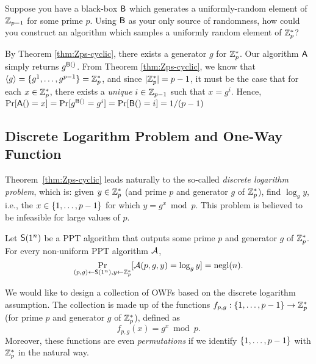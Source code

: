 \documentclass[11pt]{article}
\begin{document}
\begin{question}
    Suppose you have a black-box \(\mathsf{B}\) which generates a uniformly-random element
    of \(\mathbb{Z}_{p-1}\) for some prime \(p\). Using \(\mathsf{B}\) as your only source of
    randomness, how could you construct an algorithm which samples a uniformly random
    element of \(\mathbb{Z}_p^*\)?
\end{question}
\begin{answer}
    By Theorem \ref{thm:Zps-cyclic}, there exists a generator \(g\) for \(\mathbb{Z}_p^*\). Our
    algorithm \(\mathsf{A}\) simply returns \(g^{\mathsf{B}()}\). 
    From Theorem \ref{thm:Zps-cyclic}, we know that \(\langle g\rangle = \{g^1, \ldots,
    g^{p-1}\} = \mathbb{Z}_p^*\), and since \(\lvert\mathbb{Z}_p^*\rvert = p - 1\), it must be the case that
    for each \(x \in \mathbb{Z}_p^*\), there exists a \emph{unique} \(i \in \mathbb{Z}_{p-1}\) such that
    \(x = g^i\). Hence, \(\Pr[\mathsf{A}() = x] = \Pr[g^{\mathsf{B}()} = g^i] = \Pr[\mathsf{B}()
    = i] = 1/(p-1)\)
\end{answer}

\subsection{Discrete Logarithm Problem and One-Way Function}
\label{sec:dlp-owf}

Theorem~\ref{thm:Zps-cyclic} leads naturally to the so-called
\emph{discrete logarithm problem}, which is: given $y \in \mathbb{Z}_p^{*}$
(and prime $p$ and generator $g$ of $\mathbb{Z}_p^{*}$), find $\log_{g} y$,
i.e., the $x \in \{1, \ldots, p-1\}$ for which $y = g^{x} \bmod p$.
This problem is believed to be infeasible for large values of $p$.

\begin{conjecture}
  Let $\mathsf{S}(1^{n})$ be a PPT algorithm that outputs some prime $p$
  and generator $g$ of $\mathbb{Z}_p^{*}$.  For every non-uniform PPT algorithm
  $\mathcal{A}$, \[ \Pr_{(p,g) \gets \mathsf{S}(1^{n}), y \gets \mathbb{Z}_p^{*}}
  [\mathcal{A}(p,g,y) = \log_{g} y] = \operatorname{negl}(n). \]
\end{conjecture}

We would like to design a collection of OWFs based on the discrete
logarithm assumption.  The collection is made up of the functions
$f_{p,g} : \{1, \ldots, p-1\} \to \mathbb{Z}_p^{*}$ (for prime $p$ and
generator $g$ of $\mathbb{Z}_p^{*}$), defined as \[ f_{p,g}(x) = g^{x} \bmod
p. \] Moreover, these functions are even \emph{permutations} if we
identify $\{1, \ldots, p-1\}$ with $\mathbb{Z}_p^{*}$ in the natural way.
\end{document}
